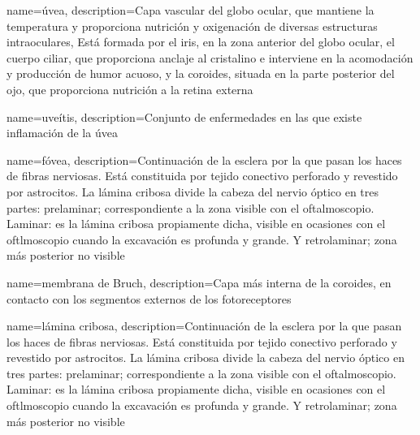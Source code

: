 {
  name={úvea},
  description={Capa vascular del globo ocular, que mantiene la
    temperatura y proporciona nutrición y oxigenación de diversas
    estructuras intraoculares, Está formada por el iris, en la zona
    anterior del globo ocular, el cuerpo ciliar, que proporciona
    anclaje al cristalino e interviene en la acomodación y producción
    de humor acuoso, y la coroides, situada en la parte posterior del
    ojo, que proporciona nutrición a la retina externa}
}

{
  name={uveítis},
  description={Conjunto de enfermedades en las que existe inflamación de la úvea}
}

{
  name={fóvea},
  description={Continuación de la esclera por la que pasan los haces
    de fibras nerviosas. Está constituida por tejido conectivo
    perforado y revestido por astrocitos. La lámina cribosa divide la
    cabeza del nervio óptico en tres partes: prelaminar;
    correspondiente a la zona visible con el oftalmoscopio. Laminar:
    es la lámina cribosa propiamente dicha, visible en ocasiones con
    el oftlmoscopio cuando la excavación es profunda y grande. Y
    retrolaminar; zona más posterior no visible}
}

{
  name={membrana de Bruch},
  description={Capa más interna de la coroides, en contacto con los
    segmentos externos de los fotoreceptores}
}

{
  name={lámina cribosa},
  description={Continuación de la esclera por la que pasan los haces
    de fibras nerviosas. Está constituida por tejido conectivo
    perforado y revestido por astrocitos. La lámina cribosa divide la
    cabeza del nervio óptico en tres partes: prelaminar;
    correspondiente a la zona visible con el oftalmoscopio. Laminar:
    es la lámina cribosa propiamente dicha, visible en ocasiones con
    el oftlmoscopio cuando la excavación es profunda y grande. Y
    retrolaminar; zona más posterior no visible}
}